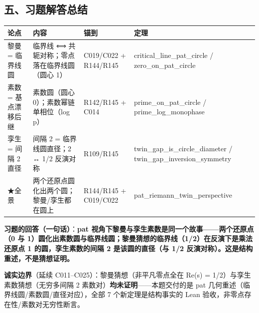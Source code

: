 \documentclass[
]{article}
\newcounter{none} %
\begin{document}
\subsection{五、习题解答总结}\label{ux4e94ux4e60ux9898ux89e3ux7b54ux603bux7ed3}

{\def\LTcaptype{none} %
\begin{longtable}[]{@{}
  >{\raggedright\arraybackslash}p{}
  >{\raggedright\arraybackslash}p{}
  >{\raggedright\arraybackslash}p{}
  >{\raggedright\arraybackslash}p{}@{}}
\toprule\noalign{}
\begin{minipage}[b]{\linewidth}\raggedright
论点
\end{minipage} & \begin{minipage}[b]{\linewidth}\raggedright
内容
\end{minipage} & \begin{minipage}[b]{\linewidth}\raggedright
锚到
\end{minipage} & \begin{minipage}[b]{\linewidth}\raggedright
定理
\end{minipage} \\
\midrule\noalign{}
\endhead
\bottomrule\noalign{}
\endlastfoot
黎曼 = 临界线圆 & 临界线 ⟺ 共轭对称；零点落在临界线圆（圆心 1） &
C019/C022 + R144/R145 & critical\_line\_pat\_circle /
zero\_on\_pat\_circle \\
素数 = 基点漂移后继 & 素数圆（圆心 0）；素数幂链单相位（log p） &
R142/R145 + C014 & prime\_on\_pat\_circle / prime\_log\_monophase \\
孪生 = 间隔 2 直径 & 间隔 2 = 临界线圆直径；2 ↔ 1/2 反演对称 & R109/R145
& twin\_gap\_is\_circle\_diameter / twin\_gap\_inversion\_symmetry \\
★全景 & 两个还原点圆化出两个圆；黎曼/孪生都在圆上 & R144/R145 +
C019/C022 & pat\_riemann\_twin\_perspective \\
\end{longtable}
}

\textbf{习题的回答（一句话）}：\textbf{pat
视角下黎曼与孪生素数是同一个故事------两个还原点（0 与
1）圆化出素数圆与临界线圆；黎曼猜想的临界线（1/2）在反演下是乘法还原点 1
的圆，孪生素数的间隔 2 是该圆的直径（与 1/2
反演对称）。这是结构重述，不是猜想证明。}

\textbf{诚实边界}（延续 C011--C025）：黎曼猜想（非平凡零点全在 Re(s) =
1/2）与孪生素数猜想（无穷多间隔 2
素数对）\textbf{均未证明}------本题交付的是 pat
几何重述（临界线圆/素数圆/直径对应），全部 7 个新定理是结构事实的 Lean
验收，非零点存在性/素数对无穷性断言。
\end{document}
